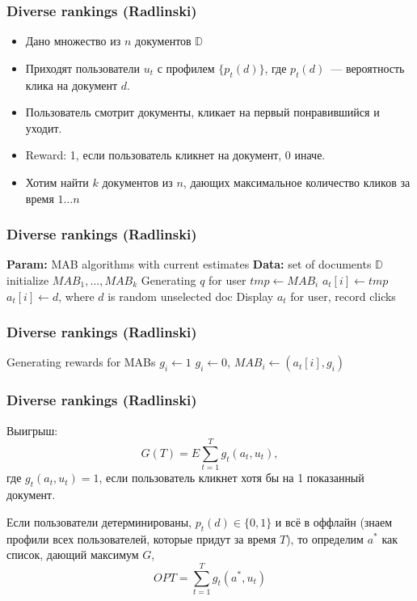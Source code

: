 \documentclass[xetex,mathserif,serif,table]{beamer}
\begin{document}
\begin{frame}
\frametitle{Diverse rankings (Radlinski)}

\begin{itemize}
\item Дано множество из $n$ документов $\mathbb{D}$
\item Приходят пользователи $u_t$ с профилем $\{p_{t}(d)\}$, где $p_{t}(d)$ — вероятность клика на  документ $d$.
\item Пользователь смотрит документы, кликает на первый понравившийся и уходит.
\item Reward: 1, если пользователь кликнет на документ, 0 иначе.
\item Хотим найти $k$ документов из $n$, дающих максимальное количество кликов за время $1…n$
\end{itemize}

\end{frame}

\begin{frame}
\frametitle{Diverse rankings (Radlinski)}

\begin{algorithmic}
\State \textbf{Param: } MAB algorithms with current estimates 
\State \textbf{Data: } set of documents $\mathbb{D}$
\State initialize  $MAB_1, … , MAB_k$
 \State Generating $q$ for user 
  \State  $tmp \gets MAB_i$
      \State $a_t[i] \gets tmp$   
    \Else
      \State $a_t[i] \gets d$, where $d$ is random unselected doc
    \EndIf
  \EndFor
  \State Display $a_t$ for user, record clicks
\end{algorithmic}

\end{frame}

\begin{frame}
\frametitle{Diverse rankings (Radlinski)}

\begin{algorithmic}
 \State Generating rewards for MABs
      \State $g_{i} \gets 1$   
    \Else
      \State $g_{i} \gets 0$,
    \EndIf
    \State $MAB_i \gets (a_t[i], g_{i})$ 
  \EndFor 
\end{algorithmic}

\end{frame}

\begin{frame}
\frametitle{Diverse rankings (Radlinski)}

Выигрыш:
$$G(T) = E\sum \limits_{t=1}^{T} g_t(a_t, u_t),$$
где $g_t(a_t, u_t) = 1$, если пользователь кликнет хотя бы на 1 показанный документ.

Если пользователи детерминированы, $p_{t}(d) \in \{0, 1\}$ и всё в оффлайн (знаем профили всех пользователей, которые придут за время $T$), то определим $a^{*}$ как список, дающий максимум $G$,
$$ OPT = \sum \limits_{t=1}^{T}g_t(a^{*}, u_t)$$


\end{frame}
\end{document}
